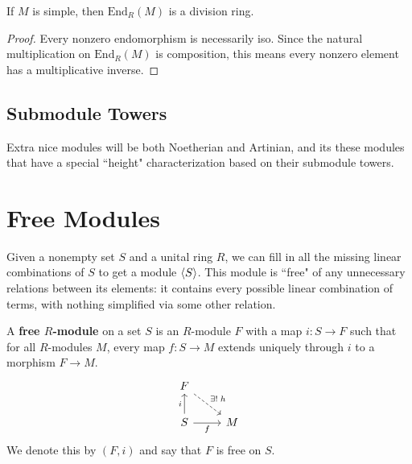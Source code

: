 \documentclass[twoside,10pt]{report}
\begin{document}
\begin{cor}[Schur]
	If $M$ is simple, then $\text{End}_{R}(M)$ is a division ring.
\end{cor}
\begin{proof}
	Every nonzero endomorphism is necessarily iso. Since the natural multiplication on $\text{End}_{R}(M)$ is composition, this means every nonzero element has a multiplicative inverse.
\end{proof}

\subsection{Submodule Towers}













Extra nice modules will be both Noetherian and Artinian, and its these modules that have a special ``height" characterization based on their submodule towers.


\section{Free Modules}

Given a nonempty set $S$ and a unital ring $R$, we can fill in all the missing linear combinations of $S$ to get a module $\langle S \rangle$. This module is ``free" of any unnecessary relations between its elements: it contains every possible linear combination of terms, with nothing simplified via some other relation.

\begin{defn}[]
A \textbf{free $R$-module} on a set $S$ is an $R$-module $F$ with a map $i:S\to F$ such that for all $R$-modules $M$, every map $f:S\to M$ extends uniquely through $i$ to a morphism $F\to M$.
\[
\begin{tikzcd}
	F \arrow[dr, dashed, "\exists! \; h"] \\
	S \uar{i}\rar["f"'] & M
\end{tikzcd}
\] 
We denote this by $(F, i)$ and say that $F$ is free on $S$.
\end{defn}
\end{document}
